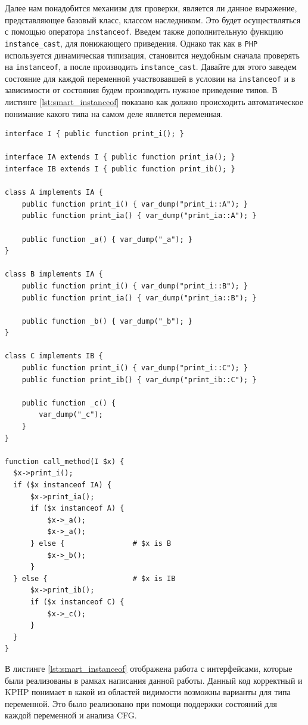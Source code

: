 Далее нам понадобится механизм для проверки, является ли данное выражение, представляющее базовый класс, классом наследником.
Это будет осуществляться с помощью оператора \verb|instanceof|.
Введем также дополнительную функцию \verb|instance_cast|, для понижающего приведения.
Однако так как в \verb|PHP| используется динамическая типизация, становится неудобным сначала проверять на \verb|instanceof|, а после производить \verb|instance_cast|.
Давайте для этого заведем состояние для каждой переменной участвовавшей в условии на \verb|instanceof| и в зависимости от состояния будем производить нужное приведение типов.
В листинге \ref{lst:smart_instanceof} показано как должно происходить автоматическое понимание какого типа на самом деле является переменная.
\begin{lstlisting}[caption={Пример использования умного оператора instanceof},label={lst:smart_instanceof}]
interface I { public function print_i(); }

interface IA extends I { public function print_ia(); }
interface IB extends I { public function print_ib(); }

class A implements IA {
    public function print_i() { var_dump("print_i::A"); }
    public function print_ia() { var_dump("print_ia::A"); }

    public function _a() { var_dump("_a"); }
}

class B implements IA {
    public function print_i() { var_dump("print_i::B"); }
    public function print_ia() { var_dump("print_ia::B"); }

    public function _b() { var_dump("_b"); }
}

class C implements IB {
    public function print_i() { var_dump("print_i::C"); }
    public function print_ib() { var_dump("print_ib::C"); }

    public function _c() {
        var_dump("_c");
    }
}

function call_method(I $x) {
  $x->print_i();
  if ($x instanceof IA) {
      $x->print_ia();
      if ($x instanceof A) {
          $x->_a();
          $x->_a();
      } else {                # $x is B
          $x->_b();
      }
  } else {                    # $x is IB
      $x->print_ib();
      if ($x instanceof C) {
          $x->_c();
      }
  }
}
\end{lstlisting}

В листинге \ref{lst:smart_instanceof} отображена работа с интерфейсами, которые были реализованы в рамках написания данной работы.
Данный код корректный и KPHP понимает в какой из областей видимости возможны варианты для типа переменной.
Это было реализовано при помощи поддержки состояний для каждой переменной и анализа CFG.

